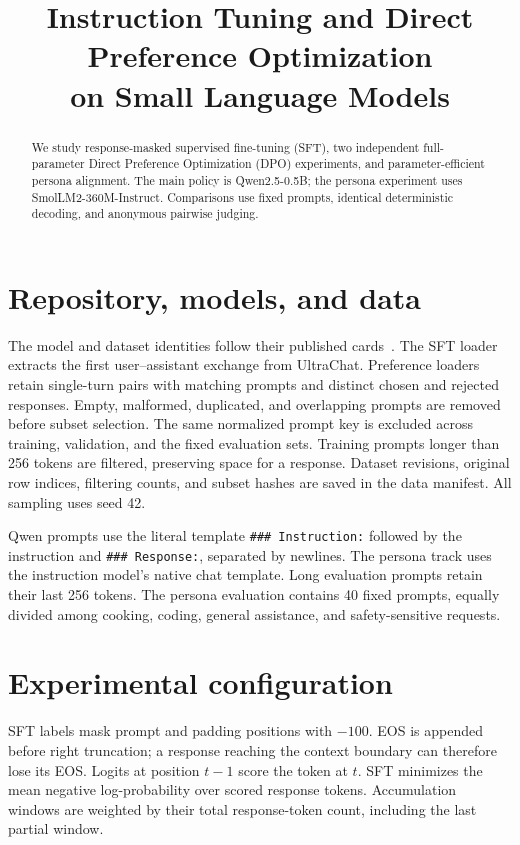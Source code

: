 \documentclass[11pt,a4paper]{article}
\title{Instruction Tuning and Direct Preference Optimization\\on Small Language Models}
\author{\ReportAuthor}
\date{\ReportDate}
\begin{document}
\maketitle
\vspace{-1.5em}
\ReportStatus
\begin{abstract}
We study response-masked supervised fine-tuning (SFT), two independent full-parameter
Direct Preference Optimization (DPO) experiments, and parameter-efficient persona
alignment. The main policy is Qwen2.5-0.5B; the persona experiment uses
SmolLM2-360M-Instruct. Comparisons use fixed prompts, identical deterministic
decoding, and anonymous pairwise judging. 
\end{abstract}

\section{Repository, models, and data}

The model and dataset identities follow their published cards~\cite{qwen,smol,ultrachat,ultrafeedback}.
The SFT loader extracts the first user--assistant exchange from UltraChat.
Preference loaders retain single-turn pairs with matching prompts and distinct
chosen and rejected responses. Empty, malformed, duplicated, and overlapping
prompts are removed before subset selection. The same normalized prompt key is
excluded across training, validation, and the fixed evaluation sets. Training
prompts longer than 256 tokens are filtered, preserving space for a response.
Dataset revisions, original row indices, filtering counts, and subset hashes are
saved in the data manifest. All sampling uses seed 42.

Qwen prompts use the literal template
\texttt{\#\#\# Instruction:} followed by the instruction and
\texttt{\#\#\# Response:}, separated by newlines. The persona track uses the
instruction model's native chat template. Long evaluation prompts retain their
last 256 tokens. The persona evaluation contains 40 fixed prompts, equally divided
among cooking, coding, general assistance, and safety-sensitive requests.

\clearpage
\section{Experimental configuration}

SFT labels mask prompt and padding positions with $-100$. EOS is appended before
right truncation; a response reaching the context boundary can therefore lose its
EOS. Logits at position $t-1$ score the token at $t$. SFT minimizes the mean negative
log-probability over scored response tokens. Accumulation windows are weighted by
their total response-token count, including the last partial window.
\end{document}
